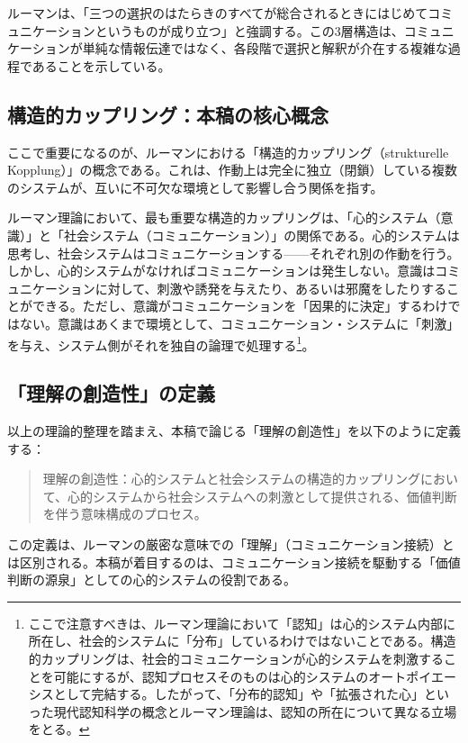 \documentclass{keikaku}
\begin{document}
ルーマンは、「三つの選択のはたらきのすべてが総合されるときにはじめてコミュニケーションというものが成り立つ」と強調する\cite{kneer1993}。この3層構造は、コミュニケーションが単純な情報伝達ではなく、各段階で選択と解釈が介在する複雑な過程であることを示している。

\subsection{構造的カップリング：本稿の核心概念}

ここで重要になるのが、ルーマンにおける「構造的カップリング（strukturelle Kopplung）」の概念である\cite{luhmann1984}\cite{maturana1980}。これは、作動上は完全に独立（閉鎖）している複数のシステムが、互いに不可欠な環境として影響し合う関係を指す。

ルーマン理論において、最も重要な構造的カップリングは、「心的システム（意識）」と「社会システム（コミュニケーション）」の関係である。心的システムは思考し、社会システムはコミュニケーションする——それぞれ別の作動を行う。しかし、心的システムがなければコミュニケーションは発生しない。意識はコミュニケーションに対して、刺激や誘発を与えたり、あるいは邪魔をしたりすることができる。ただし、意識がコミュニケーションを「因果的に決定」するわけではない。意識はあくまで環境として、コミュニケーション・システムに「刺激」を与え、システム側がそれを独自の論理で処理する\footnote{ここで注意すべきは、ルーマン理論において「認知」は心的システム内部に所在し、社会的システムに「分布」しているわけではないことである。構造的カップリングは、社会的コミュニケーションが心的システムを刺激することを可能にするが、認知プロセスそのものは心的システムのオートポイエーシスとして完結する。したがって、「分布的認知」や「拡張された心」といった現代認知科学の概念とルーマン理論は、認知の所在について異なる立場をとる。}。

\subsection{「理解の創造性」の定義}

以上の理論的整理を踏まえ、本稿で論じる「理解の創造性」を以下のように定義する：

\begin{quote}
理解の創造性：心的システムと社会システムの構造的カップリングにおいて、心的システムから社会システムへの刺激として提供される、価値判断を伴う意味構成のプロセス。
\end{quote}

この定義は、ルーマンの厳密な意味での「理解」（コミュニケーション接続）とは区別される。本稿が着目するのは、コミュニケーション接続を駆動する「価値判断の源泉」としての心的システムの役割である。
\end{document}
